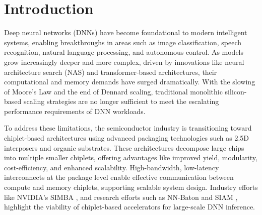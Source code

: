 \documentclass[acmsmall]{acmart}
\begin{document}



\maketitle

\hrulefill
\section{Introduction}

Deep neural networks (DNNs) have become foundational to modern intelligent systems, enabling breakthroughs in areas such as image classification, speech recognition, natural language processing, and autonomous control. As models grow increasingly deeper and more complex, driven by innovations like neural architecture search (NAS) and transformer-based architectures, their computational and memory demands have surged dramatically. With the slowing of Moore’s Law and the end of Dennard scaling, traditional monolithic silicon-based scaling strategies are no longer sufficient to meet the escalating performance requirements of DNN workloads.

To address these limitations, the semiconductor industry is transitioning toward chiplet-based architectures using advanced packaging technologies such as 2.5D interposers and organic substrates. These architectures decompose large chips into multiple smaller chiplets, offering advantages like improved yield, modularity, cost-efficiency, and enhanced scalability. High-bandwidth, low-latency interconnects at the package level enable effective communication between compute and memory chiplets, supporting scalable system design. Industry efforts like NVIDIA’s SIMBA \cite{Simba}, and research efforts such as NN-Baton \cite{nnBaton} and SIAM \cite{siam}, highlight the viability of chiplet-based accelerators for large-scale DNN inference.
\end{document}
